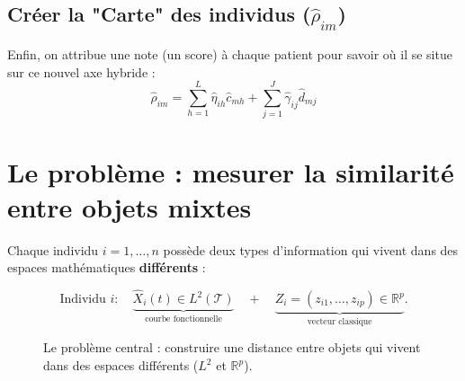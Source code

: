 \documentclass[11pt, a4paper]{article}
\newcommand{\R}{\mathbb{R}}
\newcommand{\Ltwo}{L^2(\mathcal{T})}
\begin{document}
\subsection{Créer la "Carte" des individus ($\hat{\rho}_{im}$)}
Enfin, on attribue une note (un score) à chaque patient pour savoir où il se situe sur ce nouvel axe hybride :
\begin{equation}
\hat{\rho}_{im} = \sum_{h=1}^L \hat{\eta}_{ih} \hat{c}_{mh} + \sum_{j=1}^J \hat{\gamma}_{ij} \hat{d}_{mj}
\end{equation}

\section{Le problème : mesurer la similarité entre objets mixtes}

Chaque individu $i = 1, \ldots, n$ possède deux types d'information
qui vivent dans des espaces mathématiques \textbf{différents} :

\[
  \text{Individu } i : \quad
  \underbrace{\hat{X}_i(t) \in \Ltwo}_{\text{courbe fonctionnelle}}
  \quad + \quad
  \underbrace{Z_i = (z_{i1}, \ldots, z_{ip}) \in \R^p}_{\text{vecteur classique}}.
\]

\begin{figure}[H]
\centering
{}
\caption{Le problème central : construire une distance entre objets
qui vivent dans des espaces différents ($L^2$ et $\R^p$).}
\end{figure}
\end{document}
